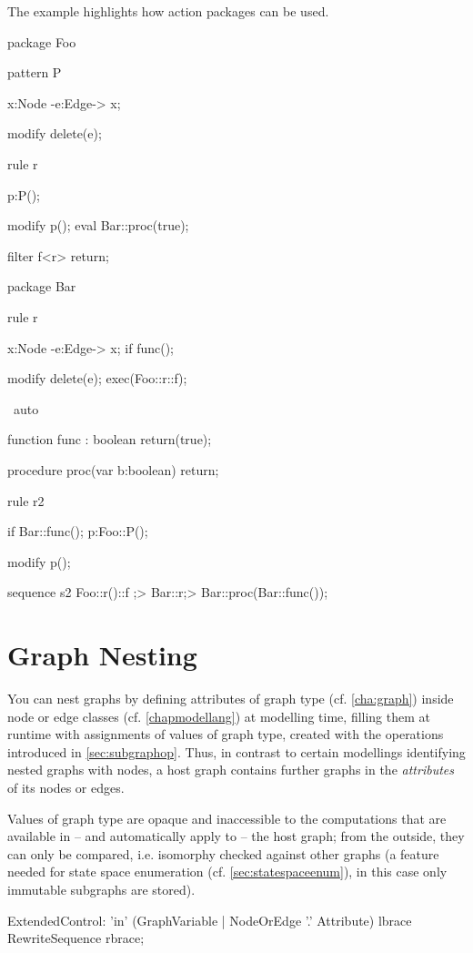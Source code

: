 \begin{example}
The example highlights how action packages can be used.
	\begin{grgen}
package Foo {
	pattern P {
		x:Node -e:Edge-> x;

		modify {
			delete(e);
		}
	}
	
	rule r {
		p:P();

		modify {
			p();
			eval { Bar::proc(true); }
		}
	}
	
	filter f<r> {
		return;
	}
}

package Bar {
	rule r {
		x:Node -e:Edge-> x;
		if{ func(); }

		modify {
			delete(e);
			exec(Foo::r\Foo::f);
		}
	} \ auto
		
	function func : boolean {
		return(true);
	}
	
	procedure proc(var b:boolean) {
		return;
	}	
}

rule r2 {
	if{ Bar::func(); }
	p:Foo::P();
	
	modify {
		p();
	}
}

sequence s2 {
	Foo::r()\Foo::f ;> Bar::r\auto ;> { Bar::proc(Bar::func()); }
}
	\end{grgen}
\end{example}

\section{Graph Nesting}\label{sec:graphnesting}

You can nest graphs by defining attributes of graph type (cf. \ref{cha:graph}) inside node or edge classes (cf. \ref{chapmodellang}) at modelling time, 
filling them at runtime with assignments of values of graph type, created with the operations introduced in \ref{sec:subgraphop}.
Thus, in contrast to certain modellings identifying nested graphs with nodes, a host graph contains further graphs in the \emph{attributes} of its nodes or edges.

Values of graph type are opaque and inaccessible to the computations that are available in -- and automatically apply to -- the host graph; 
from the outside, they can only be compared, i.e. isomorphy checked against other graphs
(a feature needed for state space enumeration (cf. \ref{sec:statespaceenum}), in this case only immutable subgraphs are stored).

\begin{rail} 
  ExtendedControl: 
    'in' (GraphVariable | NodeOrEdge '.' Attribute) lbrace RewriteSequence rbrace;
\end{rail}

